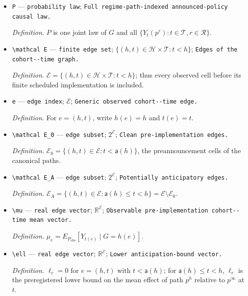 \documentclass{article}
\begin{document}
\begin{itemize}
  \item \texttt{P} --- \texttt{probability law}; \texttt{Full regime-\allowbreak{}path-\allowbreak{}indexed announced-\allowbreak{}policy causal law.}
  \par\smallskip\noindent\emph{Definition.} \(P\) is one joint law of \(G\) and all \(\{Y_t(p^r):t\in\mathcal T,r\in\mathcal R\}\).
  \item \texttt{\textbackslash{}\allowbreak{}mathcal E} --- \texttt{finite edge set}; \(\{(h,t)\in\mathcal H\times\mathcal T:t<h\}\); \texttt{Edges of the cohort-\allowbreak{}-\allowbreak{}time graph.}
  \par\smallskip\noindent\emph{Definition.} \(\mathcal E=\{(h,t)\in\mathcal H\times\mathcal T:t<h\}\); thus every observed cell before its finite scheduled implementation is included.
  \item \texttt{e} --- \texttt{edge index}; \(\mathcal E\); \texttt{Generic observed cohort-\allowbreak{}-\allowbreak{}time edge.}
  \par\smallskip\noindent\emph{Definition.} For \(e=(h,t)\), write \(h(e)=h\) and \(t(e)=t\).
  \item \texttt{\textbackslash{}\allowbreak{}mathcal E\_\allowbreak{}0} --- \texttt{edge subset}; \(2^{\mathcal E}\); \texttt{Clean pre-\allowbreak{}implementation edges.}
  \par\smallskip\noindent\emph{Definition.} \(\mathcal E_0=\{(h,t)\in\mathcal E:t<\mathsf a(h)\}\), the preannouncement cells of the canonical paths.
  \item \texttt{\textbackslash{}\allowbreak{}mathcal E\_\allowbreak{}A} --- \texttt{edge subset}; \(2^{\mathcal E}\); \texttt{Potentially anticipatory edges.}
  \par\smallskip\noindent\emph{Definition.} \(\mathcal E_A=\{(h,t)\in\mathcal E:\mathsf a(h)\le t<h\}=\mathcal E\setminus\mathcal E_0\).
  \item \texttt{\textbackslash{}\allowbreak{}mu} --- \texttt{real edge vector}; \(\mathbb R^{\mathcal E}\); \texttt{Observable pre-\allowbreak{}implementation cohort-\allowbreak{}-\allowbreak{}time mean vector.}
  \par\smallskip\noindent\emph{Definition.} \(\mu_e=E_{P_{\mathrm{obs}}}[Y_{t(e)}\mid G=h(e)]\).
  \item \texttt{\textbackslash{}\allowbreak{}ell} --- \texttt{real edge vector}; \(\mathbb R^{\mathcal E}\); \texttt{Lower anticipation-\allowbreak{}bound vector.}
  \par\smallskip\noindent\emph{Definition.} \(\ell_e=0\) for \(e=(h,t)\) with \(t<\mathsf a(h)\); for \(\mathsf a(h)\le t<h\), \(\ell_e\) is the preregistered lower bound on the mean effect of path \(p^h\) relative to \(p^\infty\) at \(t\).

\end{itemize}
\end{document}
